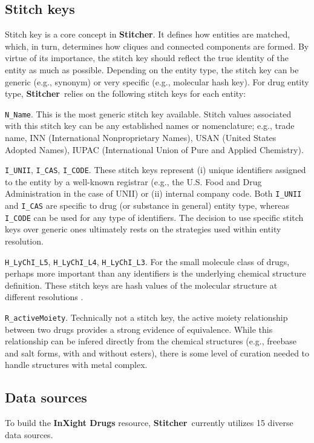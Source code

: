 \documentclass{bioinfo}
\newcommand\st{\textbf{Stitcher}}
\newcommand\ix{\textbf{InXight Drugs}}
\begin{document}
\subsection{Stitch keys}
Stitch key is a core concept in \st. It defines how entities are matched, which, in turn, determines how cliques and connected components are formed. By virtue of its importance, the stitch key should reflect the true identity of the entity as much as possible. Depending on the entity type, the stitch key can be generic (e.g., synonym) or very specific (e.g., molecular hash key). For drug entity type, \st\ relies on the following stitch keys for each entity:
\begin{unlist}
\item{\texttt{N\_Name}.} This is the most generic stitch key available. Stitch values associated with this stitch key can be any established names or nomenclature; e.g., trade name, INN (International Nonproprietary Names), USAN (United States Adopted Names), IUPAC (International Union of Pure and Applied Chemistry).
\item{\texttt{I\_UNII}, \texttt{I\_CAS}, \texttt{I\_CODE}.} These stitch keys represent (i) unique identifiers assigned to the entity by a well-known registrar (e.g., the U.S. Food and Drug Administration in the case of UNII) or (ii) internal company code. Both \texttt{I\_UNII} and \texttt{I\_CAS} are specific to drug (or substance in general) entity type, whereas \texttt{I\_CODE} can be used for any type of identifiers. The decision to use specific stitch keys over generic ones ultimately rests on the strategies used within entity resolution.
\item{\texttt{H\_LyChI\_L5}, \texttt{H\_LyChI\_L4}, \texttt{H\_LyChI\_L3}.} For the small molecule class of drugs, perhaps more important than any identifiers is the underlying chemical structure definition. These stitch keys are hash values of the molecular structure at different resolutions \citep{lychi2019}.
\item{\texttt{R\_activeMoiety}.} Technically not a stitch key, the active moiety relationship between two drugs provides a strong evidence of equivalence. While this relationship can be infered directly from the chemical structures (e.g., freebase and salt forms, with and without esters), there is some level of curation needed to handle structures with metal complex.
\end{unlist}

\subsection{Data sources}
To build the \ix{} resource, \st\ currently utilizes 15 diverse data sources.
\end{document}
